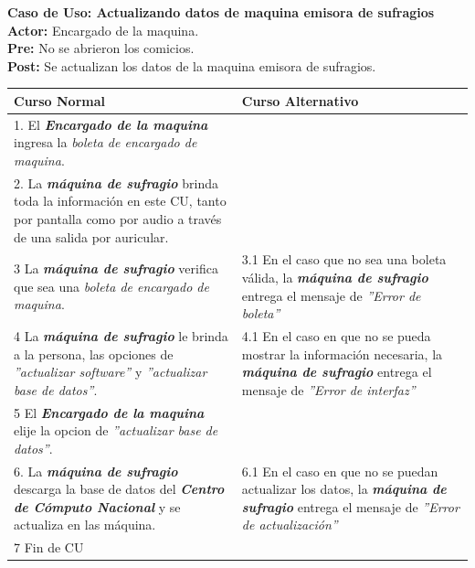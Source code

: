 \documentclass[spanish, 10pt,a4paper]{article}
\numberwithin{equation}{section} %
\begin{document}
\noindent\textbf{Caso de Uso: Actualizando datos de maquina emisora de sufragios}\\
\textbf{Actor: } Encargado de la maquina.\\
\textbf{Pre: } No se abrieron los comicios.\\
\textbf{Post: } Se actualizan los datos de la maquina emisora de sufragios.\\
\begin{table}[H]
  \centering
\bgroup
\def\arraystretch{1.3}
  \begin{tabular}{p{9cm} | p{7cm}}
    \hline
    Curso Normal & Curso Alternativo \\
    \hline
    \hline    
    1. El \textbf{\textit{Encargado de la maquina}} ingresa la \textit{boleta de encargado de maquina}. 
    & \\
    
    \hline
    2. La \textbf{\textit{máquina de sufragio}} brinda toda la información en este CU, tanto por pantalla como por audio a través de una salida por auricular.
    &
    \\
    
    \hline
    3 La \textbf{\textit{máquina de sufragio}} verifica que sea una \textit{boleta de encargado de maquina}.
    & 
    3.1 En el caso que no sea una boleta válida, la \textbf{\textit{máquina de sufragio}} entrega el mensaje de \textit{''Error de boleta''}
    \\
    
    \hline
    4 La \textbf{\textit{máquina de sufragio}} le brinda a la persona, las opciones de \textit{''actualizar software''} y \textit{''actualizar base de datos''}.
    & 
    4.1 En el caso en que no se pueda mostrar la información necesaria, la \textbf{\textit{máquina de sufragio}} entrega el mensaje de \textit{''Error de interfaz''}
    \\
    
    \hline
    5 El \textbf{\textit{Encargado de la maquina}} elije la opcion de \textit{''actualizar base de datos''}.
    & \\
    
    \hline
    6. La \textbf{\textit{máquina de sufragio}} descarga la base de datos del \textbf{\textit{Centro de Cómputo Nacional}} y se actualiza en las máquina.
    &
    6.1 En el caso en que no se puedan actualizar los datos, la \textbf{\textit{máquina de sufragio}} entrega el mensaje de \textit{''Error de actualización''}
    \\
    
    \hline
    7 Fin de CU
    & \\
    \hline
  \end{tabular}
\egroup
\end{table}
\end{document}
